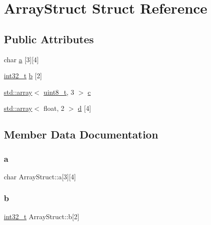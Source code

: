 \hypertarget{struct_array_struct}{}\section{Array\+Struct Struct Reference}
\label{struct_array_struct}
\subsection*{Public Attributes}
\begin{DoxyCompactItemize}
\item 
char \mbox{\hyperlink{struct_array_struct_a2f3560d3a89b9189d2b4670b458fc9b0}{a}} \mbox{[}3\mbox{]}\mbox{[}4\mbox{]}
\item 
\mbox{\hyperlink{_s_d_l__config_8h_ab1967d8591af1a4e48c37fd2b0f184d0}{int32\+\_\+t}} \mbox{\hyperlink{struct_array_struct_ab52e2c9b28e3228b2d0db5c29862d045}{b}} \mbox{[}2\mbox{]}
\item 
\mbox{\hyperlink{_s_d_l__opengl__glext_8h_a52f38e7d822a46377fde7a02708eedb1}{std\+::array}}$<$ \mbox{\hyperlink{_s_d_l__config_8h_aba7bc1797add20fe3efdf37ced1182c5}{uint8\+\_\+t}}, 3 $>$ \mbox{\hyperlink{struct_array_struct_a43ce42e67ad78bdae008a678cd25bf4b}{c}}
\item 
\mbox{\hyperlink{_s_d_l__opengl__glext_8h_a52f38e7d822a46377fde7a02708eedb1}{std\+::array}}$<$ float, 2 $>$ \mbox{\hyperlink{struct_array_struct_a9e593acba466a7c7cac1c487bc6e81a7}{d}} \mbox{[}4\mbox{]}
\end{DoxyCompactItemize}


\subsection{Member Data Documentation}
\mbox{\label{struct_array_struct_a2f3560d3a89b9189d2b4670b458fc9b0}} 
\subsubsection{\texorpdfstring{a}{a}}
{\footnotesize\ttfamily char Array\+Struct\+::a\mbox{[}3\mbox{]}\mbox{[}4\mbox{]}}

\mbox{\label{struct_array_struct_ab52e2c9b28e3228b2d0db5c29862d045}} 
\subsubsection{\texorpdfstring{b}{b}}
{\footnotesize\ttfamily \mbox{\hyperlink{_s_d_l__config_8h_ab1967d8591af1a4e48c37fd2b0f184d0}{int32\+\_\+t}} Array\+Struct\+::b\mbox{[}2\mbox{]}}

